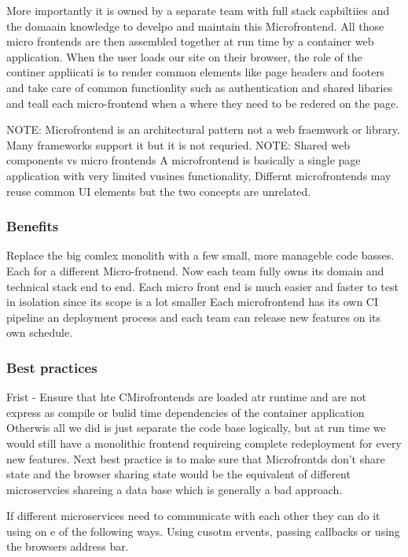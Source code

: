 \documentclass[a4paper, 11pt]{book}
\begin{document}
{    More importantly it is owned by a separate team with full stack capbiltiies and the domaain knowledge to develpo and maintain this Microfrontend.
    All those micro frontends are then assembled together at run time by a container web application.
    When the user loads our site on their browser, the role of the continer appliicati is to render common elements like page headers and footers and take care of common functionlity such as authentication and shared libaries and teall each micro-frontend when a where they need to be redered on the page.

    NOTE: Microfrontend is an architectural pattern not a web fraemwork or library. Many frameworks support it but it is not requried.
    NOTE: Shared web components vs micro frontends
    A microfrontend is basically a single page application with very limited vusines functionality,
    Differnt microfrontends may reuse common UI elements but the two concepts are unrelated.

    \subsubsection{Benefits}
    Replace the big comlex monolith with a few small, more manageble code basses. Each for a different Micro-frotnend.
    Now each team fully owns its domain and technical stack end to end.
    Each micro front end is much easier and faster to test in isolation since its scope is a lot smaller
    Each microfrontend has its own CI pipeline an deployment process and each team can release new features on its own schedule.

    \subsubsection{Best practices}
    Frist - Ensure that hte CMirofrontends are loaded atr runtime and are not express as compile or bulid time dependencies of the container application
    Otherwis all we did is just separate the code base logically, but at run time we would still have a monolithic frontend requireing complete redeployment for every new features.
    Next best practice is to make sure that Microfrontds don't share state and the browser sharing state would be the equivalent of different microservcies shareing a data base which is generally a bad approach.

    If different microservices need to communicate with each other they can do it using on e of the following ways. Using cusotm ervents, passing callbacks or using the browsers address bar.

}
\end{document}
